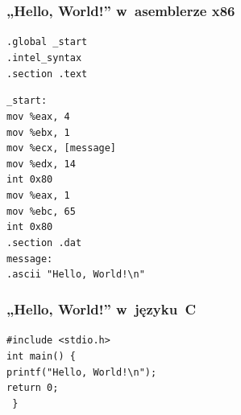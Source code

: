 \documentclass[10pt,t]{beamer}
\begin{document}
\begin{frame}
  \frametitle{„Hello, World!” w~asemblerze x86
    \parencite{Low-Level-You-Can-Learn-Assembly-in-10-Minutes-ETC-Ver-2020}}


  \texttt{.global \_start} \\
  \texttt{.intel\_syntax} \\
  \texttt{.section .text}

  \texttt{\_start:} \\
  \hphantom{aaaa} \texttt{mov \%eax, 4} \\
  \hphantom{aaaa} \texttt{mov \%ebx, 1} \\
  \hphantom{aaaa} \texttt{mov \%ecx, [message]} \\
  \hphantom{aaaa} \texttt{mov \%edx, 14} \\
  \hphantom{aaaa} \texttt{int 0x80} \\
  \hphantom{aaaa} \texttt{mov \%eax, 1} \\
  \hphantom{aaaa} \texttt{mov \%ebc, 65} \\
  \hphantom{aaaa} \texttt{int 0x80} \\
  \texttt{.section .dat} \\
  \texttt{message:} \\
  \hphantom{aaaa} \texttt{.ascii "Hello, World!\textbackslash n"}

\end{frame}





\begin{frame}
  \frametitle{„Hello, World!” w~języku~C}


  \texttt{\#include <stdio.h>} \\
  \vspace{0.8em}
  \texttt{int main() \{ } \\
  \hphantom{aaaa} \texttt{printf("Hello, World!\textbackslash n");} \\
  \vspace{0.8em}
  \vspace{0.8em}
  \vspace{0.8em}
  \vspace{0.8em}
  \hphantom{aaaa} \texttt{return 0;} \\
  \texttt{ \} }

\end{frame}
\end{document}
